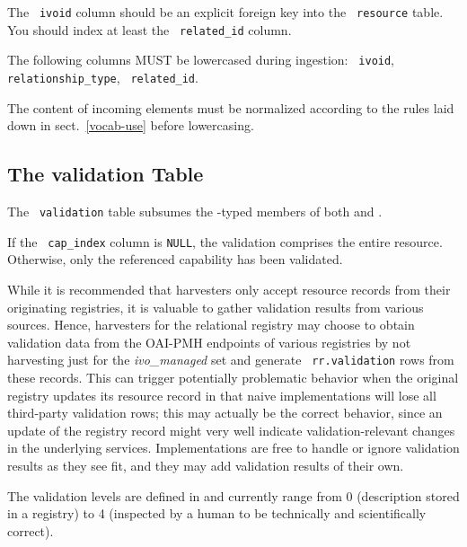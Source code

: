 \documentclass[11pt,a4paper]{ivoa}
\newcommand{\rtent}[1]{\texttt{\color{rtcolor} #1}}
\begin{document}

 

The \rtent{ivoid} column should be an explicit foreign key into the
\rtent{resource} table.  You should index at least the
\rtent{related\_id} column.

The following columns MUST be lowercased during ingestion:
\rtent{ivoid}, \rtent{relationship\_type},
\rtent{related\_id}.

The content of incoming 
elements must be normalized according to the rules laid down in
sect.~\ref{vocab-use} before lowercasing.


\subsection{The validation Table}

\label{table_validation}

The \rtent{validation} table subsumes the
-typed members of both 
and .

If the \rtent{cap\_index} column is \texttt{NULL}, the
validation comprises the entire resource.  Otherwise, only the
referenced capability has been validated.

While it is recommended that harvesters only accept resource records
from their originating registries, it is valuable to gather validation
results from various sources.  Hence, harvesters for the relational
registry may choose to obtain validation data from the OAI-PMH endpoints
of various registries by not harvesting just for the \emph{ivo\_managed} set and
generate \rtent{rr.validation} rows from these records.  This can
trigger potentially problematic behavior when the original registry
updates  its resource record in that naive implementations will lose all
third-party validation rows; this may actually be the correct behavior,
since an update of the registry record might very well indicate
validation-relevant changes in the underlying services.  Implementations
are free to handle or ignore validation results as they see fit, and
they may add validation results of their own.

The validation levels are defined in \citet{std:RM} and
currently range from 0 (description stored in a registry) to 
4 (inspected by a human to be technically and scientifically
correct).


\end{document}
